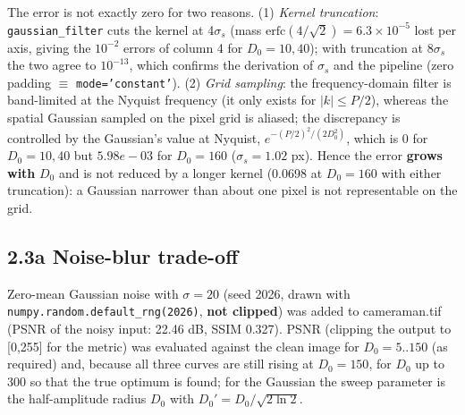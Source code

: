 \documentclass[10pt,a4paper]{article}
\begin{document}
The error is not exactly zero for two reasons. (1) \textit{Kernel truncation}: \texttt{gaussian\_\allowbreak{}filter} cuts the kernel at 4$\sigma_s$ (mass $\mathrm{erfc}(4/\sqrt2)=6.3\times10^{-5}$ lost per axis, giving the $10^{-2}$ errors of column 4 for $D_0=10,40$); with truncation at 8$\sigma_s$ the two agree to $10^{-13}$, which confirms the derivation of $\sigma_s$ and the pipeline (zero padding $\equiv$ \texttt{mode=\allowbreak{}'constant'}). (2) \textit{Grid sampling}: the frequency-domain filter is band-limited at the Nyquist frequency (it only exists for $|k|\le P/2$), whereas the spatial Gaussian sampled on the pixel grid is aliased; the discrepancy is controlled by the Gaussian's value at Nyquist, $e^{-(P/2)^2/(2D_0^2)}$, which is $0$ for $D_0=10,40$ but $5.98e-03$ for $D_0=160$ ($\sigma_s=1.02$ px). Hence the error \textbf{grows with }$D_0$ and is not reduced by a longer kernel (0.0698 at $D_0=160$ with either truncation): a Gaussian narrower than about one pixel is not representable on the grid.

\subsection{2.3a Noise-blur trade-off}
Zero-mean Gaussian noise with $\sigma=20$ (seed 2026, drawn with \texttt{numpy.\allowbreak{}random.\allowbreak{}default\_\allowbreak{}rng(\allowbreak{}2026)}, \textbf{not clipped}) was added to cameraman.tif (PSNR of the noisy input: 22.46 dB, SSIM 0.327). PSNR (clipping the output to [0,255] for the metric) was evaluated against the clean image for $D_0=5..150$ (as required) and, because all three curves are still rising at $D_0=150$, for $D_0$ up to 300 so that the true optimum is found; for the Gaussian the sweep parameter is the half-amplitude radius $D_0$ with $D_0'=D_0/\sqrt{2\ln2}$.
\end{document}
